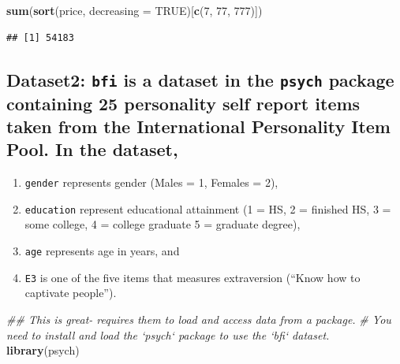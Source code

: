 \documentclass[]{book}
\newenvironment{Shaded}{\begin{snugshade}}{\end{snugshade}}
\newcommand{\CommentTok}[1]{\textcolor[rgb]{0.56,0.35,0.01}{\textit{#1}}}
\newcommand{\DataTypeTok}[1]{\textcolor[rgb]{0.13,0.29,0.53}{#1}}
\newcommand{\DecValTok}[1]{\textcolor[rgb]{0.00,0.00,0.81}{#1}}
\newcommand{\KeywordTok}[1]{\textcolor[rgb]{0.13,0.29,0.53}{\textbf{#1}}}
\newcommand{\NormalTok}[1]{#1}
\newcommand{\OtherTok}[1]{\textcolor[rgb]{0.56,0.35,0.01}{#1}}
\providecommand{\tightlist}{%
  \setlength{\itemsep}{0pt}\setlength{\parskip}{0pt}}
\begin{document}
\begin{Shaded}
\begin{Highlighting}[]
\KeywordTok{sum}\NormalTok{(}\KeywordTok{sort}\NormalTok{(price, }\DataTypeTok{decreasing =} \OtherTok{TRUE}\NormalTok{)[}\KeywordTok{c}\NormalTok{(}\DecValTok{7}\NormalTok{, }\DecValTok{77}\NormalTok{, }\DecValTok{777}\NormalTok{)])}
\end{Highlighting}
\end{Shaded}

\begin{verbatim}
## [1] 54183
\end{verbatim}

\hypertarget{dataset2-bfi-is-a-dataset-in-the-psych-package-containing-25-personality-self-report-items-taken-from-the-international-personality-item-pool.-in-the-dataset}{%
\subsection{\texorpdfstring{Dataset2: \texttt{bfi} is a dataset in the \texttt{psych} package containing 25 personality self report items taken from the International Personality Item Pool. In the dataset,}{Dataset2: bfi is a dataset in the psych package containing 25 personality self report items taken from the International Personality Item Pool. In the dataset,}}\label{dataset2-bfi-is-a-dataset-in-the-psych-package-containing-25-personality-self-report-items-taken-from-the-international-personality-item-pool.-in-the-dataset}}

\begin{enumerate}
\def\labelenumi{\arabic{enumi}.}
\tightlist
\item
  \texttt{gender} represents gender (Males = 1, Females = 2),
\item
  \texttt{education} represent educational attainment (1 = HS, 2 = finished HS, 3 = some college, 4 = college graduate 5 = graduate degree),
\item
  \texttt{age} represents age in years, and
\item
  \texttt{E3} is one of the five items that measures extraversion (``Know how to captivate people'').
\end{enumerate}

\begin{Shaded}
\begin{Highlighting}[]
\CommentTok{## This is great- requires them to load and access data from a package.}
\CommentTok{# You need to install and load the `psych` package to use the `bfi` dataset.}
\KeywordTok{library}\NormalTok{(psych)}
\end{Highlighting}
\end{Shaded}
\end{document}
